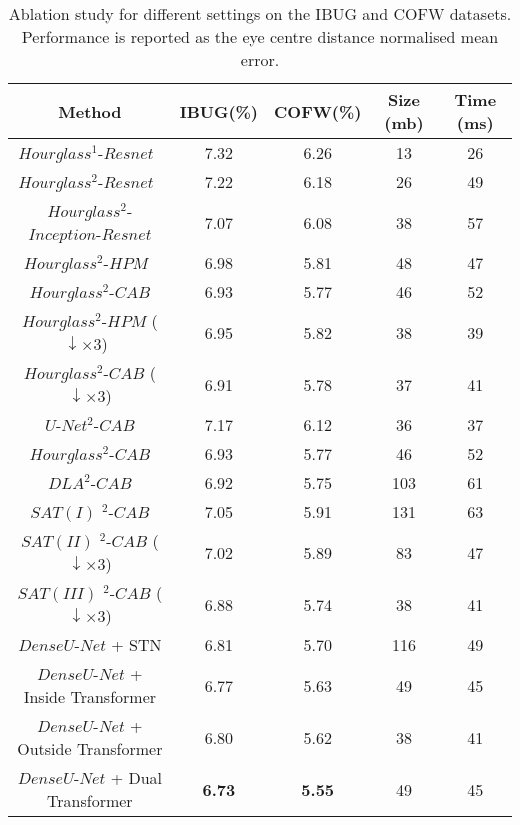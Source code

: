 \documentclass{bmvc2k}
\begin{document}
\begin{table}
\begin{center}
\begin{tabular}{c|c|c|c|c}
\hline
Method                                            & IBUG(\%) & COFW(\%) & Size (mb) & Time (ms)\\
\hline
$Hourglass^1$-$Resnet$~\cite{newell2016stacked}     & 7.32  & 6.26  & 13 & 26 \\
$Hourglass^2$-$Resnet$~\cite{newell2016stacked}     & 7.22  & 6.18  & 26 & 49 \\
\hline
$Hourglass^2$-$Inception$-$Resnet$                    & 7.07  & 6.08  & 38 & 57 \\
$Hourglass^2$-$HPM$~\cite{bulat2017far}             & 6.98  & 5.81  & 48 & 47 \\
$Hourglass^2$-$CAB$                                 & 6.93  & 5.77  & 46 & 52 \\    \hline
$Hourglass^2$-$HPM$ ($\downarrow \times 3$)~\cite{bulat2017far} & 6.95  & 5.82  & 38 & 39 \\ 
$Hourglass^2$-$CAB$ ($\downarrow \times 3$)                     & 6.91  & 5.78  & 37 & 41 \\
\hline
$U$-$Net^2$-$CAB$                        &  7.17  & 6.12  & 36   & 37\\
$Hourglass^2$-$CAB$                      &  6.93  & 5.77  & 46   & 52 \\    $DLA^2$-$CAB$                            &  6.92  & 5.75  & 103  & 61\\
$SAT (I)$   $^2$-$CAB$                   &  7.05  & 5.91  & 131  & 63\\
$SAT (II)$  $^2$-$CAB$ ($\downarrow \times 3$)           & 7.02  & 5.89  & 83 & 47\\
$SAT (III)$ $^2$-$CAB$ ($\downarrow \times 3$)           & 6.88  & 5.74  & 38 & 41 \\ 
\hline
$Dense U$-$Net$ + STN                                                         & 6.81  & 5.70  & 116 & 49\\
$Dense U$-$Net$ + Inside Transformer                                          & 6.77  & 5.63  & 49 & 45 \\
\hline
$Dense U$-$Net$ + Outside Transformer                                         & 6.80  & 5.62  & 38 & 41\\
\hline
$Dense U$-$Net$ + Dual Transformer                                            & {\bf 6.73}  & {\bf 5.55}  & 49 & 45 \\
\hline
\end{tabular}
\end{center}
\vspace{-2mm}
\caption{Ablation study for different settings on the IBUG and COFW datasets. Performance is reported as the eye centre distance normalised mean error.}
\vspace{-4mm}
\label{tab:ablation}
\end{table}
\end{document}
